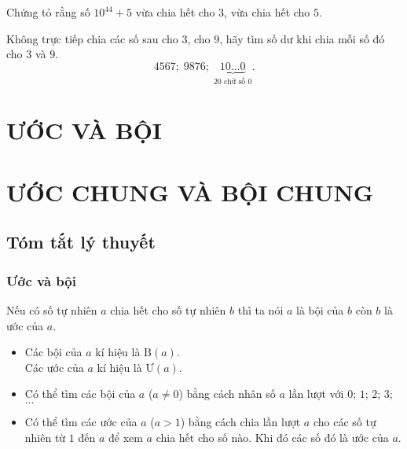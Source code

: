 \begin{bt}%
	Chứng tỏ rằng số $10^{44}+5$ vừa chia hết cho $3$, vừa chia hết cho $5$.
\end{bt}
\begin{bt}%
	Không trực tiếp chia các số sau cho $3$, cho $9$, hãy tìm số dư khi chia mỗi số đó cho $3$ và $9$.
	$$4567;\; 9876;\; \underbrace{{10\ldots 0}}_{\text{$20$ chữ số $0$}}.$$
\end{bt}
\section{ƯỚC VÀ BỘI}
\setcounter{section}{15}
\section{ƯỚC CHUNG VÀ BỘI CHUNG}
\subsection{Tóm tắt lý thuyết}
\subsubsection{Ước và bội}
Nếu có số tự nhiên $a$ chia hết cho số tự nhiên $b$ thì ta nói $a$ là bội của $b$ còn $b$ là ước của $a$.
\begin{itemize}
	\item Các bội của $a$ kí hiệu là $\mathrm{B}(a)$.\\
	Các ước của $a$ kí hiệu là $\mathrm{\text{Ư}}(a)$.
	\item Có thể tìm các bội của $a$ ($a\neq 0$) bằng cách nhân số $a$ lần lượt với $0$; $1$; $2$; $3$; $\ldots$
	\item Có thể tìm các ước của $a$ ($a>1$) bằng cách chia lần lượt $a$ cho các số tự nhiên từ $1$ đến $a$ để xem $a$ chia hết cho số nào. Khi đó các số đó là ước của $a$.
\end{itemize}
